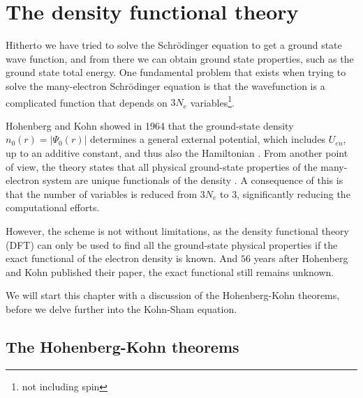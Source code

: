 \begin{comment}
This plays a vital role later, as we will see, since the energy is a \textit{functional} of the the wavefunction, denoted as $E_0\left[ \Psi \right]$.
\end{comment}

\section{The density functional theory}

Hitherto we have tried to solve the Schrödinger equation to get a ground state wave function, and from there we can obtain ground state properties, such as the ground state total energy. One fundamental problem that exists when trying to solve the many-electron Schrödinger equation is that the wavefunction is a complicated function that depends on $3N_e$ variables\footnote{not including spin}.

Hohenberg and Kohn \cite{Hohenberg1964} showed in 1964 that the ground-state density $n_0(r) = \lvert \Psi_0 (r)\rvert$ determines a general external potential, which includes $U_{en}$, up to an additive constant, and thus also the Hamiltonian \cite{Toulouse2019}. From another point of view, the theory states that all physical ground-state properties of the many-electron system are unique functionals of the density \cite{Persson2020}. A consequence of this is that the number of variables is reduced from $3N_e$ to $3$, significantly reducing the computational efforts.

However, the scheme is not without limitations, as the density functional theory (DFT) can only be used to find all the ground-state physical properties if the exact functional of the electron density is known. And $56$ years after Hohenberg and Kohn published their paper, the exact functional still remains unknown.

We will start this chapter with a discussion of the Hohenberg-Kohn theorems, before we delve further into the Kohn-Sham equation.

\subsection{The Hohenberg-Kohn theorems}

